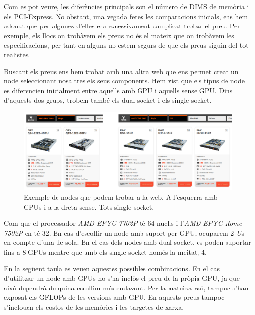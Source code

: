 Com es pot veure, les diferències principals son el número de DIMS de memòria i els PCI-Express. No obstant, una vegada fetes les comparacions inicials, ens hem adonat que per algunes d'elles era excessivament complicat trobar el preu. Per exemple, els llocs on trobàvem els preus no és el mateix que on trobàvem les especificacions, per tant en alguns no estem segurs de que els preus siguin del tot realistes.

Buscant els preus ens hem trobat amb una altra web \cite{webnodes} que ens permet crear un node seleccionant nosaltres els seus components. Hem vist que els tipus de node es diferencien inicialment entre aquells amb GPU i aquells sense GPU. Dins d'aquests dos grups, trobem també els dual-socket i els single-socket.

\begin{figure}[H]
    \centering
    \includegraphics[width=\textwidth]{img/webnodes.png}
    \caption{Exemple de nodes que podem trobar a la web. A l'esquerra amb GPUs i a la dreta sense. Tots single-socket.}
\end{figure}

Com que el processador \textit{AMD EPYC 7702P} té 64 nuclis i l'\textit{AMD EPYC Rome 7502P} en té 32. En cas d'escollir un node amb suport per GPU, ocuparem 2 \textit{U}s en compte d'una de sola. En el cas dels nodes amb dual-socket, es poden suportar fins a 8 GPUs mentre que amb els single-socket només la meitat, 4.

En la següent taula es veuen aquestes possibles combinacions. En el cas d'utilitzar un node amb GPUs no s'ha inclòs el preu de la pròpia GPU, ja que això dependrà de quina escollim més endavant. Per la mateixa raó, tampoc s'han exposat els GFLOPs de les versions amb GPU. En aquests preus tampoc s'inclouen els costos de les memòries i les targetes de xarxa.

